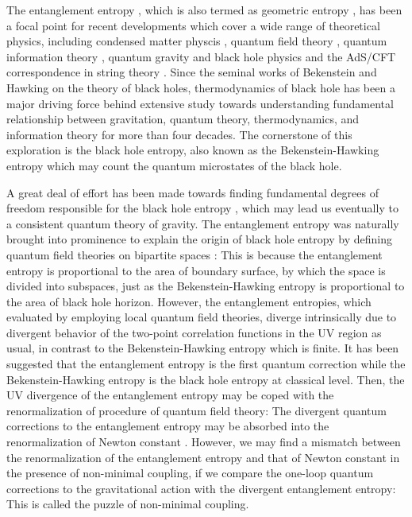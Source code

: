 \documentclass[aps,showpacs,showkeys]{revtex4}
\begin{document}
The entanglement entropy \cite{Eisert2010}, which is also termed as geometric entropy \cite{Bombelli1986,Srednicki1993,Holzhey94LW,Callan1994W,Dowker1994,Larsen1994W,Casini2004}, 
has been a focal point for recent developments which cover a wide range of theoretical physics, including 
condensed matter physcis \cite{Osborne2002N,Osterloh2002A,Vidal2003L}, 
quantum field theory \cite{Calabrese2004,Casini2008H,Casini2009,Hertzberg2011,Hertzberg2012,Seki2014,Grignani2016S},
quantum information theory \cite{Bennett2000,Nielsen2000}, 
quantum gravity and black hole physics \cite{tHooft1985,Susskind1994U,Kabat1995,Solodukin2006,Fursaev2006,Raamsdonk2006,Raamsdonk2010Gr,
Czech2012K,Swingle2014,Balasubramanian2015C} 
and the AdS/CFT correspondence in string theory 
\cite{Ryu2006T,Ryu2006TJHEP,Faulkner2013,Faulkner2013L,Faulkner2014GH}.
Since the seminal works of Bekenstein \cite{Bekenstein1973,Bekenstein1974} and Hawking \cite{Hawking1975} on the theory of black holes, thermodynamics of black hole has been a major driving force behind  
extensive study towards understanding fundamental relationship between gravitation, quantum theory, 
thermodynamics, and information theory for more than four decades. The cornerstone of this exploration 
is the black hole entropy, also known as the Bekenstein-Hawking entropy which may count the quantum 
microstates of the black hole.

A great deal of effort has been made towards finding fundamental degrees of freedom
responsible for the black hole entropy \cite{Wald2001}, which may lead us  eventually to a consistent quantum theory of gravity. The entanglement entropy \cite{Bombelli1986,Srednicki1993} was naturally brought 
into prominence to explain the origin of black hole entropy by defining quantum field theories on 
bipartite spaces \cite{Solodukhin2011}: This is because the entanglement entropy is proportional to the area of boundary surface, by which the space is divided into subspaces, just as the Bekenstein-Hawking entropy is proportional to the area of black hole horizon. However, the entanglement entropies,
which evaluated by employing local quantum field theories, diverge intrinsically due to divergent 
behavior of the two-point correlation functions in the UV region as usual, in contrast to the Bekenstein-Hawking 
entropy which is finite. It has been suggested \cite{Callan1994W,Susskind1994U} 
that the entanglement entropy is the first quantum correction while the Bekenstein-Hawking entropy is the black hole entropy at classical level. Then, the UV divergence of the entanglement entropy may be coped with the renormalization of procedure of quantum field theory: The divergent quantum corrections to the entanglement entropy may be absorbed into the renormalization of Newton constant \cite{Susskind1994U,Fursaev1995S}. 
However, we may find a mismatch between the renormalization of the entanglement entropy and that of Newton constant \cite{Solodukhin1995,Barvinsky1996} in the presence of non-minimal coupling, if we compare the one-loop quantum corrections to the gravitational action with the divergent entanglement entropy: This is called the puzzle of non-minimal coupling. 
\end{document}
